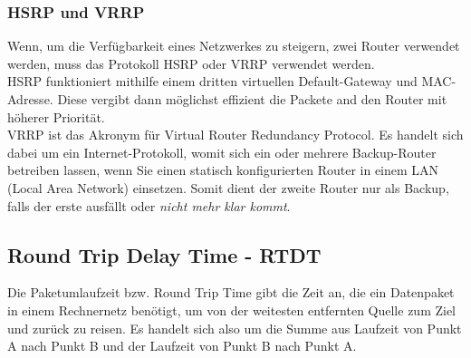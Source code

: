 \documentclass[12pt,a4paper]{article}
\begin{document}
		\subsubsection{HSRP und VRRP}
		Wenn, um die Verfügbarkeit eines Netzwerkes zu steigern, zwei Router verwendet werden, muss das Protokoll HSRP oder VRRP verwendet werden. \\
		HSRP funktioniert mithilfe einem dritten virtuellen Default-Gateway und MAC-Adresse. Diese vergibt dann möglichst effizient die Packete and den Router mit höherer Priorität.\\
		VRRP ist das Akronym für Virtual Router Redundancy Protocol. Es handelt sich dabei um ein Internet-Protokoll, womit sich ein oder mehrere Backup-Router betreiben lassen, wenn Sie einen statisch konfigurierten Router in einem LAN (Local Area Network) einsetzen. Somit dient der zweite Router nur als Backup, falls der erste ausfällt oder \textit{nicht mehr klar kommt}.

		\subsection{Round Trip Delay Time - RTDT}
			Die Paketumlaufzeit bzw. Round Trip Time gibt die Zeit an, die ein Datenpaket in einem Rechnernetz benötigt, um von der weitesten entfernten Quelle zum Ziel und zurück zu reisen. Es handelt sich also um die Summe aus Laufzeit von Punkt A nach Punkt B und der Laufzeit von Punkt B nach Punkt A.
				\begin{center}
				\end{center}
		
\end{document}
